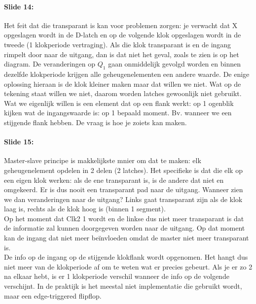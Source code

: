 \documentclass[10pt,a4paper]{book}
\begin{document}
\paragraph{Slide 14:}  Het feit dat die transparant is kan voor problemen zorgen: je verwacht dat X opgeslagen wordt in de D-latch en op de volgende klok opgeslagen wordt in de tweede (1 klokperiode vertraging). Als die klok transparant is en de ingang rimpelt door naar de uitgang, dan is dat niet het geval, zoals te zien is op het diagram. De veranderingen op $Q_1$ gaan onmiddelijk gevolgd worden en binnen dezelfde klokperiode krijgen alle geheugenelementen een andere waarde. De enige oplossing hieraan is de klok kleiner maken maar dat willen we niet. Wat op de tekening staat willen we niet, daarom worden latches gewoonlijk niet gebruikt.\\
Wat we eigenlijk willen is een element dat op een flank werkt: op 1 ogenblik kijken wat de ingangswaarde is: op 1 bepaald moment. Bv. wanneer we een stijgende flank hebben. De vraag is hoe je zoiets kan maken.

\paragraph{Slide 15:} Master-slave principe is makkelijkste mnier om dat te maken: elk geheugenelement opdelen in 2 delen (2 latches). Het specifieke is dat die elk op een eigen klok werken: als de ene transparant is, is de andere dat niet en omgekeerd. Er is dus nooit een transparant pad naar de uitgang. Wanneer zien we dan veranderingen naar de uitgang? Links gaat transparant zijn als de klok laag is, rechts als de klok hoog is (binnen 1 segment).\\
Op het moment dat Clk2 1 wordt en de linkse dus niet meer transparant is dat de informatie zal kunnen doorgegeven worden naar de uitgang. Op dat moment kan de ingang dat niet meer be\"invloeden omdat de master niet meer transparant is.\\
De info op de ingang op de stijgende klokflank wordt opgenomen. Het hangt dus niet meer van de klokperiode af om te weten wat er precies gebeurt. Als je er zo 2 na elkaar hebt, is er 1 klokperiode verschil wanneer de info op de volgende verschijnt. In de praktijk is het meestal niet implementatie die gebruikt wordt, maar een edge-triggered flipflop.
\end{document}
